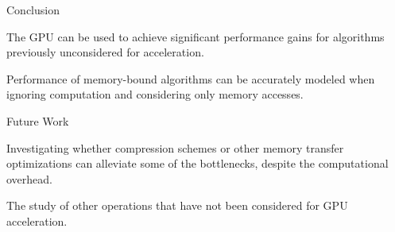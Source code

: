 \documentclass[final]{beamer}
\newlength{\sepwidth}
\newlength{\colwidth}
\newcommand{\separatorcolumn}{\begin{column}{\sepwidth}\end{column}}
\begin{document}
\begin{frame}[t]
\begin{columns}[t]
\begin{column}{\colwidth}
\begin{block}{Conclusion}

  \begin{description}[font=$\bullet$~\normalfont\scshape\color{red!50!black}]
    \item The GPU can be used to achieve significant performance gains for algorithms previously unconsidered for acceleration.
    \item Performance of memory-bound algorithms can be accurately modeled when ignoring computation and considering only memory accesses. 
  \end{description}

\end{block}

\begin{block}{Future Work}

\begin{description}[font=$\bullet$~\normalfont\scshape\color{red!50!black}]
\item Investigating whether compression schemes or other memory transfer optimizations can alleviate some of the bottlenecks, despite the computational overhead.
\item The study of other operations that have not been considered for GPU acceleration.
\end{description}

\end{block}


\end{column}

\separatorcolumn
\end{columns}
\end{frame}
\end{document}

